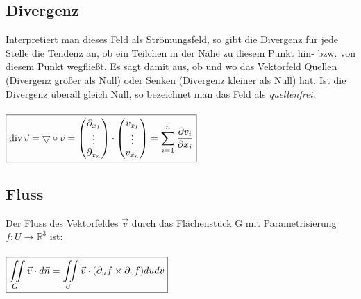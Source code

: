 \subsection{Divergenz}
Interpretiert man dieses Feld als Strömungsfeld, so gibt die Divergenz für jede
Stelle die Tendenz an, ob ein Teilchen in der Nähe zu diesem Punkt hin- bzw.
von diesem Punkt wegfließt. Es sagt damit aus, ob und wo das Vektorfeld Quellen
(Divergenz größer als Null) oder Senken (Divergenz kleiner als Null) hat. Ist
die Divergenz überall gleich Null, so bezeichnet man das Feld als
\textit{quellenfrei}.\\\\
$\boxed{\operatorname{div} \vec{v}=\bigtriangledown\circ \vec{v}=
	\begin{pmatrix}
    	\partial_{x_1}\\
    	\vdots\\
    	\partial_{x_n}
    \end{pmatrix}\cdot
	\begin{pmatrix}
    	v_{x_1}\\
    	\vdots\\
    	v_{x_n}
    \end{pmatrix}=
\sum\limits_{i=1}^n \frac{\partial v_i}{\partial x_i}}$

\subsection{Fluss}
Der Fluss des Vektorfeldes $\vec{v}$ durch das Flächenstück G mit
Parametrisierung $f:U\rightarrow\mathbb{R}^3$ ist:\\\\
$\boxed{\iint\limits_G\vec{v}\cdot d\vec{n}=\iint\limits_U \vec{v}\cdot
(\partial_{u} f\times\partial_{v} f) dudv}$

